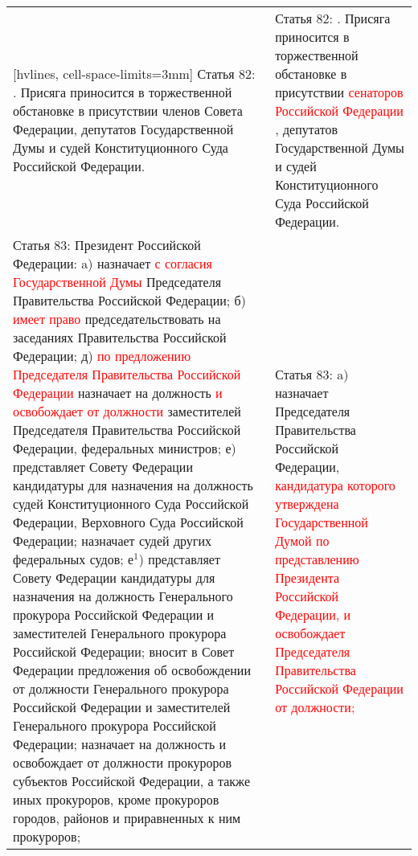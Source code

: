 \documentclass[a4paper,14pt]{extarticle}
\begin{document}
	\pagebreak
	\noindent
	\begin{NiceTabular}{p{92mm}p{91mm}}[hvlines, cell-space-limits=3mm]
		Статья 82: . Присяга приносится в торжественной обстановке в присутствии членов Совета Федерации, депутатов Государственной Думы и судей Конституционного Суда Российской Федерации. &
		Статья 82: . Присяга приносится в торжественной обстановке в присутствии \textcolor{red}{сенаторов Российской Федерации }, депутатов Государственной Думы и судей Конституционного Суда Российской Федерации. \\
		
		Статья 83: \newline
		Президент Российской Федерации: \newline
		a) назначает \textcolor{red}{с согласия Государственной Думы} Председателя Правительства Российской Федерации; \newline
		б) \textcolor{red}{имеет право} председательствовать на заседаниях Правительства Российской Федерации; \newline
		д) \textcolor{red}{по предложению Председателя Правительства Российской Федерации} назначает на должность \textcolor{red}{и освобождает от должности} заместителей Председателя Правительства Российской Федерации, федеральных министров; \newline
		е) представляет Совету Федерации кандидатуры для назначения на должность судей Конституционного Суда Российской Федерации, Верховного Суда Российской Федерации; назначает судей других федеральных судов; \newline
		е$^1$) представляет Совету Федерации кандидатуры для назначения на должность Генерального прокурора Российской Федерации и заместителей Генерального прокурора Российской Федерации; вносит в Совет Федерации предложения об освобождении от должности Генерального прокурора Российской Федерации и заместителей Генерального прокурора Российской Федерации; назначает на должность и освобождает от должности прокуроров субъектов Российской Федерации, а также иных прокуроров, кроме прокуроров городов, районов и приравненных к ним прокуроров;
		&
		Статья 83: \newline
		a) назначает Председателя Правительства Российской Федерации,
		\textcolor{red}{кандидатура которого утверждена Государственной Думой по представлению Президента Российской Федерации, и освобождает Председателя Правительства Российской Федерации от должности;} \newline

\end{NiceTabular}
\end{document}
